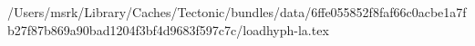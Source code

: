 /Users/msrk/Library/Caches/Tectonic/bundles/data/6ffe055852f8faf66c0acbe1a7fb27f87b869a90bad1204f3bf4d9683f597c7c/loadhyph-la.tex